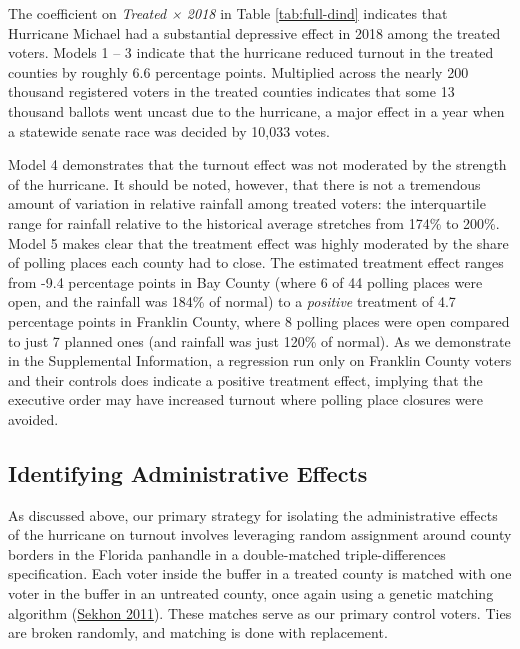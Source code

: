 \documentclass[
  12pt,
]{article}
\begin{document}
\begin{singlespace}

\end{singlespace}

The coefficient on \emph{Treated × 2018} in Table \ref{tab:full-dind} indicates that Hurricane Michael had a substantial depressive effect in 2018 among the treated voters. Models 1 -- 3 indicate that the hurricane reduced turnout in the treated counties by roughly 6.6 percentage points. Multiplied across the nearly 200 thousand registered voters in the treated counties indicates that some 13 thousand ballots went uncast due to the hurricane, a major effect in a year when a statewide senate race was decided by 10,033 votes.

Model 4 demonstrates that the turnout effect was not moderated by the strength of the hurricane. It should be noted, however, that there is not a tremendous amount of variation in relative rainfall among treated voters: the interquartile range for rainfall relative to the historical average stretches from 174\% to 200\%. Model 5 makes clear that the treatment effect was highly moderated by the share of polling places each county had to close. The estimated treatment effect ranges from -9.4 percentage points in Bay County (where 6 of 44 polling places were open, and the rainfall was 184\% of normal) to a \emph{positive} treatment of 4.7 percentage points in Franklin County, where 8 polling places were open compared to just 7 planned ones (and rainfall was just 120\% of normal). As we demonstrate in the Supplemental Information, a regression run only on Franklin County voters and their controls does indicate a positive treatment effect, implying that the executive order may have increased turnout where polling place closures were avoided.

\hypertarget{identifying-administrative-effects}{%
\subsection*{Identifying Administrative Effects}\label{identifying-administrative-effects}}

As discussed above, our primary strategy for isolating the administrative effects of the hurricane on turnout involves leveraging random assignment around county borders in the Florida panhandle in a double-matched triple-differences specification. Each voter inside the buffer in a treated county is matched with one voter in the buffer in an untreated county, once again using a genetic matching algorithm (\protect\hyperlink{ref-Sekhon2011}{Sekhon 2011}). These matches serve as our primary control voters. Ties are broken randomly, and matching is done with replacement.
\end{document}
